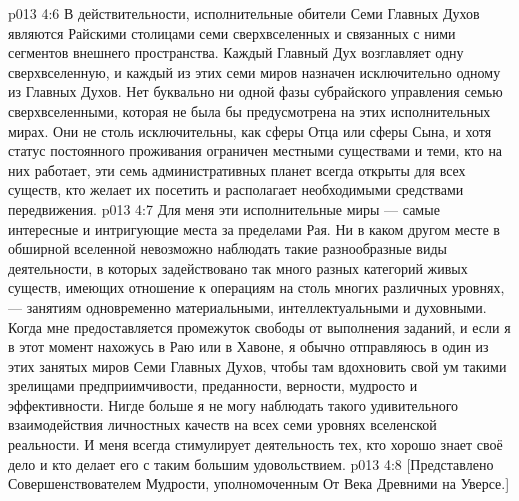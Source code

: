 \vs p013 4:6 \pc В действительности, исполнительные обители Семи Главных Духов являются Райскими столицами семи сверхвселенных и связанных с ними сегментов внешнего пространства. Каждый Главный Дух возглавляет одну сверхвселенную, и каждый из этих семи миров назначен исключительно одному из Главных Духов. Нет буквально ни одной фазы субрайского управления семью сверхвселенными, которая не была бы предусмотрена на этих исполнительных мирах. Они не столь исключительны, как сферы Отца или сферы Сына, и хотя статус постоянного проживания ограничен местными существами и теми, кто на них работает, эти семь административных планет всегда открыты для всех существ, кто желает их посетить и располагает необходимыми средствами передвижения.
\vs p013 4:7 Для меня эти исполнительные миры --- самые интересные и интригующие места за пределами Рая. Ни в каком другом месте в обширной вселенной невозможно наблюдать такие разнообразные виды деятельности, в которых задействовано так много разных категорий живых существ, имеющих отношение к операциям на столь многих различных уровнях, --- занятиям одновременно материальными, интеллектуальными и духовными. Когда мне предоставляется промежуток свободы от выполнения заданий, и если я в этот момент нахожусь в Раю или в Хавоне, я обычно отправляюсь в один из этих занятых миров Семи Главных Духов, чтобы там вдохновить свой ум такими зрелищами предприимчивости, преданности, верности, мудросто и эффективности. Нигде больше я не могу наблюдать такого удивительного взаимодействия личностных качеств на всех семи уровнях вселенской реальности. И меня всегда стимулирует деятельность тех, кто хорошо знает своё дело и кто делает его с таким большим удовольствием.
\vsetoff
\vs p013 4:8 [Представлено Совершенствователем Мудрости, уполномоченным От Века Древними на Уверсе.]
\quizlink
